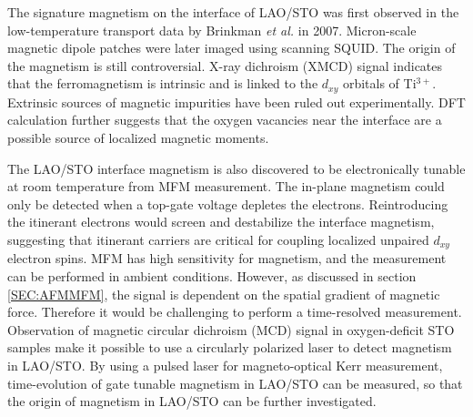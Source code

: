 \documentclass[pdflatex, sectionletters, 12pt]{pittetd}    %
\begin{document}
The signature magnetism on the interface of LAO/STO was first observed in the low-temperature transport data by Brinkman \textit{et al.} in 2007\cite{brinkman2007magnetic}. Micron-scale magnetic dipole patches were later imaged using scanning SQUID\cite{bert2011direct, kalisky2012scanning, kalisky2012critical}. The origin of the magnetism is still controversial. X-ray dichroism (XMCD) signal indicates that the ferromagnetism is intrinsic and is linked to the $d_{xy}$ orbitals of Ti$^{3+}$\cite{lee2013titanium}. Extrinsic sources of magnetic impurities have been ruled out experimentally\cite{brinkman2007magnetic, lee2013titanium, ariando2011electronic}. DFT calculation further suggests that the oxygen vacancies near the interface are a possible source of localized magnetic moments\cite{pentcheva2006charge}. 

The LAO/STO interface magnetism is also discovered to be electronically tunable at room temperature from MFM measurement\cite{bi2014room}. The in-plane magnetism could only be detected when a top-gate voltage depletes the electrons. Reintroducing the itinerant electrons would screen and destabilize the interface magnetism, suggesting that itinerant carriers are critical for coupling localized unpaired $d_{xy}$ electron spins\cite{fidkowski2013magnetic, Joshua2013gate, banerjee2013ferromagnetic}. MFM has high sensitivity for magnetism, and the measurement can be performed in ambient conditions. However, as discussed in section \ref{SEC:AFMMFM}, the signal is dependent on the spatial gradient of magnetic force. Therefore it would be challenging to perform a time-resolved measurement. Observation of magnetic circular dichroism (MCD) signal in oxygen-deficit STO samples\cite{rice2014persistent} make it possible to use a circularly polarized laser to detect magnetism in LAO/STO. By using a pulsed laser for magneto-optical Kerr measurement, time-evolution of gate tunable magnetism in LAO/STO can be measured, so that the origin of magnetism in LAO/STO can be further investigated.
\end{document}
